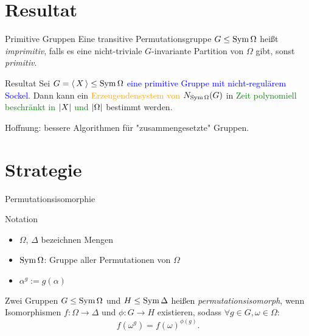 
\section{Resultat}
\begin{frame}{Primitive Gruppen}
Eine transitive Permutationsgruppe $G \leq \operatorname{Sym} \Omega$ heißt
\emph{imprimitiv},
\pause
falls es eine nicht-triviale
$G$-invariante Partition von $\Omega$ gibt,
\pause
sonst \emph{primitiv}.

\pause
{}
\end{frame}



\begin{frame}{Resultat}
    Sei \textcolor{blue}{$G =  \left\langle \, X \, \right\rangle  \leq \operatorname{Sym} \Omega$ eine primitive Gruppe
    mit nicht-regulärem Sockel}.
    \pause
    Dann kann ein
    \textcolor{orange}{Erzeugendensystem von $N_{\operatorname{Sym} \Omega}(G)$}
    \pause
    in
    \textcolor{green}{Zeit polynomiell beschränkt in $ \left| X \right| $ und $ \left| \Omega \right| $} bestimmt werden.

\pause
Hoffnung:
bessere Algorithmen für "zusammengesetzte" Gruppen.
\end{frame}

\section{Strategie}

\begin{frame}{Permutationsisomorphie}
\begin{block}{Notation}
\begin{itemize}
\item
$\Omega$, $\Delta$ bezeichnen Mengen
\item
$\operatorname{Sym} \Omega$:
Gruppe aller Permutationen von $\Omega$
\item
$\alpha ^ g := g(\alpha)$
\end{itemize}
\end{block}

Zwei Gruppen $G \leq \operatorname{Sym} \Omega$ und $H \leq \operatorname{Sym} \Delta$ heißen
\emph{permutationsisomorph}, wenn
Isomorphismen $f : \Omega \to \Delta$ und $\phi : G \to H$ existieren,
sodass
$\forall g \in G, \omega \in \Omega$:
\[
    f( \omega ^ g ) = f(\omega) ^ {\phi(g)}.
\]
\end{frame}


